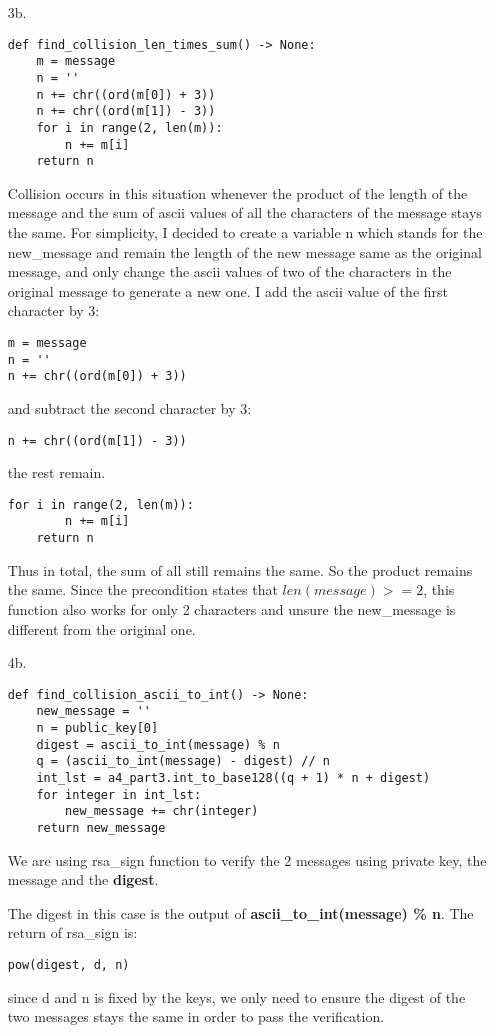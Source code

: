 \documentclass[11pt]{article}
\begin{document}
\begin{enumerate}

\item[3b.]

\begin{verbatim}
def find_collision_len_times_sum() -> None:
    m = message
    n = ''
    n += chr((ord(m[0]) + 3))
    n += chr((ord(m[1]) - 3))
    for i in range(2, len(m)):
        n += m[i]
    return n

\end{verbatim}
Collision occurs in this situation whenever the product of the length of the message and the sum of ascii values of all the characters of the message stays the same. For simplicity, I decided to create a variable n which stands for the new\_message and remain the length of the new message same as the original message, and only change the ascii values of two of the characters in the original message to generate a new one. I add the ascii value of the first character by 3:
\begin{verbatim}
m = message
n = ''
n += chr((ord(m[0]) + 3))
\end{verbatim}
and subtract the second character by 3:
\begin{verbatim}
n += chr((ord(m[1]) - 3))
\end{verbatim}
the rest remain.
\begin{verbatim}
for i in range(2, len(m)):
        n += m[i]
    return n
\end{verbatim}
Thus in total, the sum of all still remains the same. So the product remains the same. Since the precondition states that $len(message) >= 2$, this function also works for only 2 characters and unsure the new\_message is different from the original one.

\newpage

\item[4b.]

\begin{verbatim}
def find_collision_ascii_to_int() -> None:
    new_message = ''
    n = public_key[0]
    digest = ascii_to_int(message) % n
    q = (ascii_to_int(message) - digest) // n
    int_lst = a4_part3.int_to_base128((q + 1) * n + digest)
    for integer in int_lst:
        new_message += chr(integer)
    return new_message

\end{verbatim}
We are using rsa\_sign function to verify the 2 messages using private key, the message and the \textbf{digest}.

The digest in this case is the output of \textbf{ascii\_to\_int(message) \% n}. The return of rsa\_sign is:
\begin{verbatim}
pow(digest, d, n)
\end{verbatim}
since d and n is fixed by the keys, we only need to ensure the digest of the two messages stays the same in order to pass the verification.


\end{enumerate}
\end{document}
